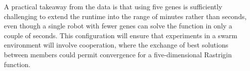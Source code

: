 \documentclass{report}
\begin{document}
A practical takeaway from the data is that using five genes is sufficiently challenging to extend the runtime into the range of minutes rather than seconds, even though a single robot with fewer genes can solve the function in only a couple of seconds. This configuration will ensure that experiments in a swarm environment will involve cooperation, where the exchange of best solutions between members could permit convergence for a five-dimensional Rastrigin function.







\newpage
\printbibliography
\end{document}

